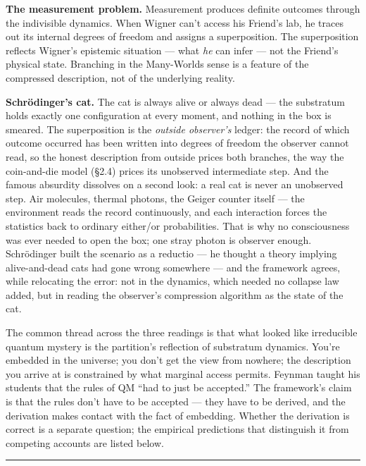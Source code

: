 \documentclass[
]{article}
\begin{document}
\textbf{The measurement problem.} Measurement produces definite outcomes
through the indivisible dynamics. When Wigner can't access his Friend's
lab, he traces out its internal degrees of freedom and assigns a
superposition. The superposition reflects Wigner's epistemic situation
--- what \emph{he} can infer --- not the Friend's physical state.
Branching in the Many-Worlds sense is a feature of the compressed
description, not of the underlying reality.

\textbf{Schrödinger's cat.} The cat is always alive or always dead ---
the substratum holds exactly one configuration at every moment, and
nothing in the box is smeared. The superposition is the \emph{outside
observer's} ledger: the record of which outcome occurred has been
written into degrees of freedom the observer cannot read, so the honest
description from outside prices both branches, the way the coin-and-die
model (§2.4) prices its unobserved intermediate step. And the famous
absurdity dissolves on a second look: a real cat is never an unobserved
step. Air molecules, thermal photons, the Geiger counter itself --- the
environment reads the record continuously, and each interaction forces
the statistics back to ordinary either/or probabilities. That is why no
consciousness was ever needed to open the box; one stray photon is
observer enough. Schrödinger built the scenario as a reductio --- he
thought a theory implying alive-and-dead cats had gone wrong somewhere
--- and the framework agrees, while relocating the error: not in the
dynamics, which needed no collapse law added, but in reading the
observer's compression algorithm as the state of the cat.

The common thread across the three readings is that what looked like
irreducible quantum mystery is the partition's reflection of substratum
dynamics. You're embedded in the universe; you don't get the view from
nowhere; the description you arrive at is constrained by what marginal
access permits. Feynman taught his students that the rules of QM ``had
to just be accepted.'' The framework's claim is that the rules don't
have to be accepted --- they have to be derived, and the derivation
makes contact with the fact of embedding. Whether the derivation is
correct is a separate question; the empirical predictions that
distinguish it from competing accounts are listed below.

\begin{center}\rule{0.5\linewidth}{0.5pt}\end{center}
\end{document}
